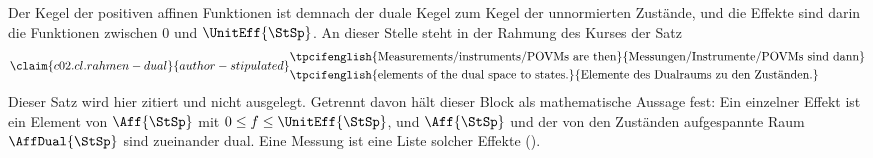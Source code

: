 \begin{vertiefung}
  Der Kegel der positiven affinen Funktionen ist demnach der duale Kegel zum Kegel der
  unnormierten Zustände, und die Effekte sind darin die Funktionen zwischen $0$ und
  $\UnitEff{\StSp}$. An dieser Stelle steht in der Rahmung des Kurses der Satz
  \begin{equation}\label{c02.eq.rahmen-dual}\claim{c02.cl.rahmen-dual}{author-stipulated}
    \begin{aligned}
      &\text{\tpcifenglish{Measurements/instruments/POVMs are then}{Messungen/Instrumente/POVMs sind dann}} \\
      &\text{\tpcifenglish{elements of the dual space to states.}{Elemente des Dualraums zu den Zuständen.}}
    \end{aligned}
  \end{equation}
  Dieser Satz wird hier zitiert und nicht ausgelegt. Getrennt davon hält dieser Block als
  mathematische Aussage fest: Ein einzelner Effekt ist ein Element von
  $\Aff{\StSp}$ mit $0 \leq f \leq \UnitEff{\StSp}$, und $\Aff{\StSp}$ und der von den
  Zuständen aufgespannte Raum $\AffDual{\StSp}$ sind zueinander dual. Eine Messung ist eine
  Liste solcher Effekte ().


\end{vertiefung}
